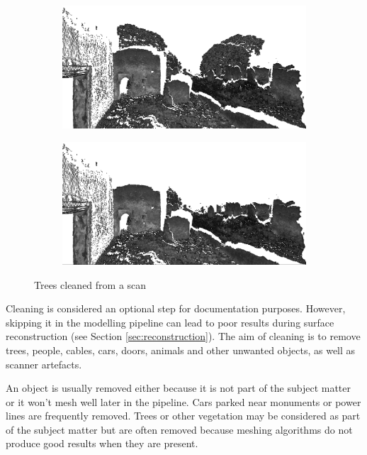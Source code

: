 \begin{figure}[ht]
	\begin{subfigure}[b]{.5\textwidth}
	  \centering
	  \includegraphics[width=.9\linewidth]{images/dirty}
	\end{subfigure}%
	\begin{subfigure}[b]{.5\textwidth}
	  \centering
	  \includegraphics[width=.9\linewidth]{images/clean}
	\end{subfigure}
  \caption{Trees cleaned from a scan}
  \label{fig:cleaning}
\end{figure}

Cleaning is considered an optional step for documentation purposes. However, skipping it in the modelling pipeline can lead to poor results during surface reconstruction (see Section \ref{sec:reconstruction}). The aim of cleaning is to remove trees, people, cables, cars, doors, animals and other unwanted objects, as well as scanner artefacts.

An object is usually removed either because it is not part of the subject matter or it won't mesh well later in the pipeline. Cars parked near monuments or power lines are frequently removed. Trees or other vegetation may be considered as part of the subject matter but are often removed because meshing algorithms do not produce good results when they are present.

